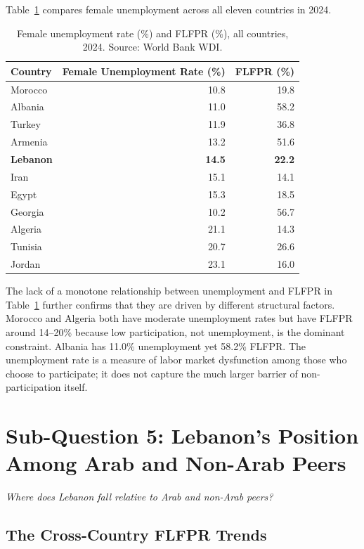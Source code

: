 \documentclass[12pt,a4paper]{article}
\begin{document}
Table~\ref{tab:fur_compare} compares female unemployment across all eleven countries in 2024.

\begin{table}[H]
\centering
\caption{Female unemployment rate (\%) and FLFPR (\%), all countries, 2024. Source: World Bank WDI.}
\label{tab:fur_compare}
\begin{tabular}{lrr}
\toprule
\textbf{Country} & \textbf{Female Unemployment Rate (\%)} & \textbf{FLFPR (\%)} \\
\midrule
Morocco  & 10.8 & 19.8 \\
Albania  & 11.0 & 58.2 \\
Turkey   & 11.9 & 36.8 \\
Armenia  & 13.2 & 51.6 \\
\textbf{Lebanon}  & \textbf{14.5} & \textbf{22.2} \\
Iran     & 15.1 & 14.1 \\
Egypt    & 15.3 & 18.5 \\
Georgia  & 10.2 & 56.7 \\
Algeria  & 21.1 & 14.3 \\
Tunisia  & 20.7 & 26.6 \\
Jordan   & 23.1 & 16.0 \\
\bottomrule
\end{tabular}
\end{table}

The lack of a monotone relationship between unemployment and FLFPR in Table~\ref{tab:fur_compare} further confirms that they are driven by different structural factors. Morocco and Algeria both have moderate unemployment rates but have FLFPR around 14--20\% because low participation, not unemployment, is the dominant constraint. Albania has 11.0\% unemployment yet 58.2\% FLFPR. The unemployment rate is a measure of labor market dysfunction among those who choose to participate; it does not capture the much larger barrier of non-participation itself.

\section{Sub-Question 5: Lebanon's Position Among Arab and Non-Arab Peers}
\label{sec:crosscountry}

\textit{Where does Lebanon fall relative to Arab and non-Arab peers?}

\subsection{The Cross-Country FLFPR Trends}
\end{document}
